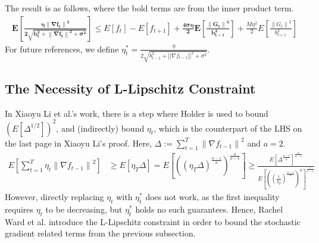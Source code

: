 \documentclass[14pt,onecolumn,letterpaper]{extarticle}
\begin{document}
    The result is as follows, where the bold terms are from the inner product term. 
    \begin{align*}
        \boldsymbol{E\left[\frac{\eta\left\|\nabla f_t\right\|^2}{2 \sqrt{b_t^2+\left\|\nabla f_t\right\|^2+\sigma^2}}\right]} \leq E\left[f_t\right]-E\left[f_{t+1}\right]+\boldsymbol{\frac{4 \sigma\eta}{2} E\left[\frac{\left\|G_t\right\|^2}{b_{t+1}^2}\right]}+ \frac{M\eta^2 }{2} E\left[\frac{\left\|G_t\right\|^2}{b_{t+1}^2}\right]
    \end{align*}
     For future references, we define $\eta_t^* = \frac{\eta}{2\sqrt{b_{t-1}^2+\left||\nabla f_{t-1}\right||^2+\sigma^2}}$.
\subsection{The Necessity of L-Lipschitz Constraint}
In Xiaoyu Li et al.'s work, there is a step where Holder is used to bound $\left(E\left[\Delta^{1 / 2}\right]\right)^{2}$, and (indirectly) bound $\eta_t$, which is the counterpart of the LHS on the last page in Xiaoyu Li's proof. Here, $\Delta:=\sum_{t=1}^T\left\|\nabla f_{t-1}\right\|^2$ and $a = 2$.
    \\$\begin{aligned} E\left[\sum_{t=1}^T \eta_t\left\|\nabla f_{t-1}\right\|^2\right] & \geq E\left[\eta_T \Delta\right]=E\left[\left(\left(\eta_T \Delta\right)^{\frac{a-1}{a}}\right)^{\frac{a}{a-1}}\right]\geq\frac{E\left[\Delta^{\frac{a-1}{a}}\right]^{\frac{a}{a-1}}}{E\left[\left(\left(\frac{1}{\eta_T}\right)^{\frac{a-1}{a}}\right)^{a}\right]^{\frac{1}{a-1}}}\end{aligned}$ \\  
    However, directly replacing $\eta_t$ with $\eta_t^*$ does not work, as the first inequality requires $\eta_t$ to be decreasing, but $\eta_t^*$ holds no such guarantees.
    Hence, Rachel Ward et al. introduce the L-Lipschitz constraint in order to bound the stochastic gradient related terms from the previous subsection.
\end{document}
